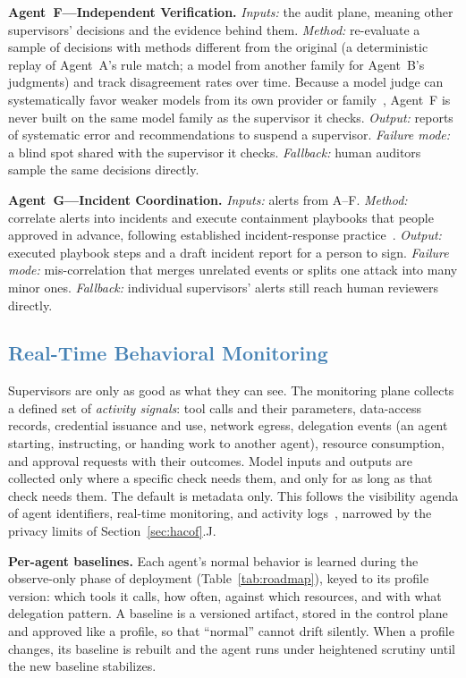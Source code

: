 \documentclass[journal]{IEEEtran}
\begin{document}
\textbf{Agent~F---Independent Verification.} \textit{Inputs:} the audit plane, meaning other supervisors' decisions and the evidence behind them. \textit{Method:} re-evaluate a sample of decisions with methods different from the original (a deterministic replay of Agent~A's rule match; a model from another family for Agent~B's judgments) and track disagreement rates over time. Because a model judge can systematically favor weaker models from its own provider or family~\cite{kim2025correlated},
Agent~F is never built on the same model family as the supervisor it checks. \textit{Output:} reports of systematic error and recommendations to suspend a supervisor. \textit{Failure mode:} a blind spot shared with the supervisor it checks. \textit{Fallback:} human auditors sample the same decisions directly.

\textbf{Agent~G---Incident Coordination.} \textit{Inputs:} alerts from A--F. \textit{Method:} correlate alerts into incidents and execute containment playbooks that people approved in advance, following established incident-response practice~\cite{nist2025incident}.
\textit{Output:} executed playbook steps and a draft incident report for a person to sign. \textit{Failure mode:} mis-correlation that merges unrelated events or splits one attack into many minor ones. \textit{Fallback:} individual supervisors' alerts still reach human reviewers directly.

\subsection{\textcolor{steelblue}{Real-Time Behavioral Monitoring}}
\label{sec:hacof-monitoring}

Supervisors are only as good as what they can see. The monitoring plane collects a defined set of \textit{activity signals}: tool calls and their parameters, data-access records, credential issuance and use, network egress, delegation events (an agent starting, instructing, or handing work to another agent), resource consumption, and approval requests with their outcomes. Model inputs and outputs are collected only where a specific check needs them, and only for as long as that check needs them. The default is metadata only. This follows the visibility agenda of agent identifiers, real-time monitoring, and activity logs~\cite{chan2024visibility},
narrowed by the privacy limits of Section~\ref{sec:hacof}.J.

\textbf{Per-agent baselines.} Each agent's normal behavior is learned during the observe-only phase of deployment (Table~\ref{tab:roadmap}), keyed to its profile version: which tools it calls, how often, against which resources, and with what delegation pattern. A baseline is a versioned artifact, stored in the control plane and approved like a profile, so that ``normal'' cannot drift silently. When a profile changes, its baseline is rebuilt and the agent runs under heightened scrutiny until the new baseline stabilizes.
\end{document}
